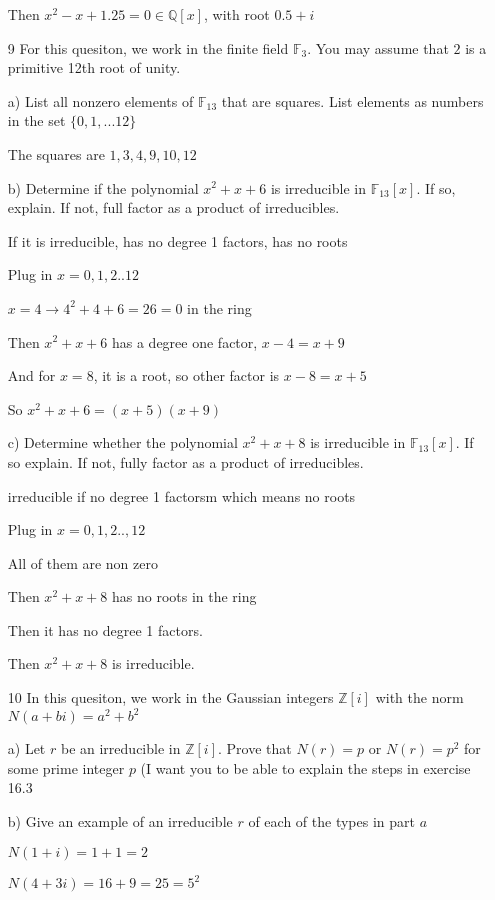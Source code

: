 \documentclass[12pt]{article}
\begin{document}
\begin{itemize}
		Then $x^2 - x + 1.25 = 0 \in \mathbb{Q}[x]$, with root $0.5 + i$ 

	\item[9] For this quesiton, we work in the finite field $\mathbb{F}_{3}$. You may assume that $2$ is a primitive 12th root of unity.

		a) List all nonzero elements of $\mathbb{F}_{13}$ that are squares. List elements as numbers in the set $\{0,1,...12\}$

		The squares are	$1, 3, 4, 9, 10, 12$

		b) Determine if the polynomial $x^2 + x + 6$ is irreducible in $\mathbb{F}_{13}[x]$. If so, explain. If not, full factor as a product of irreducibles.

		If it is irreducible, has no degree 1 factors, has no roots

		Plug in $x = 0,1,2..12$

		$x =4 \rightarrow 4^2 + 4 + 6 = 26 = 0$ in the ring

		Then $x^2+x+6$ has a degree one factor, $x-4 = x+9$

		And for $x = 8$, it is a root, so other factor is $x-8 = x+5$

		So $x^2 + x + 6 = (x+5)(x+9)$

		c) Determine whether the polynomial $x^2 + x + 8$ is irreducible in $\mathbb{F}_{13}[x]$. If so explain. If not, fully factor as a product of irreducibles.

		irreducible if no degree 1 factorsm which means no roots

		Plug in $x = 0,1,2..,12$

		All of them are non zero

		Then $x^2 + x + 8$ has no roots in the ring

		Then it has no degree 1 factors.

		Then $x^2 + x + 8$ is irreducible.

	\item[10] In this quesiton, we work in the Gaussian integers $\mathbb{Z}[i]$  with the norm $N(a+bi) = a^2 + b^2$

		a) Let $r$ be an irreducible in $\mathbb{Z}[i]$. Prove that $N(r) = p$ or $N(r) = p^2$ for some prime integer $p$ (I want you to be able to explain the steps in exercise 16.3

		b) Give an example of an irreducible $r$ of each of the types in part $a$

		$N(1+i) = 1 + 1 = 2$

		$N(4 + 3i) = 16 + 9 = 25 = 5^2$


\end{itemize}
\end{document}
